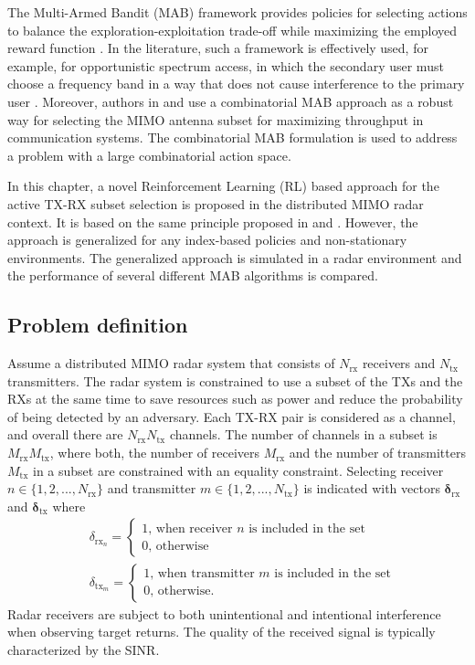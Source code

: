 \documentclass[english, 12pt, a4paper, elec, utf8, a-1b, online]{aaltothesis}
\newcommand{\easvtx}{\delta_{\text{tx}_m}}
\newcommand{\vasvtx}{\boldsymbol{\delta}_{\text{tx}}}
\newcommand{\easvrx}{\delta_{\text{rx}_n}}
\newcommand{\vasvrx}{\boldsymbol{\delta}_{\text{rx}}}
\begin{document}
The Multi-Armed Bandit (MAB) framework provides policies for selecting actions to balance the exploration-exploitation trade-off while maximizing the employed reward function \cite{Lattimore2019}.
In the literature, such a framework is effectively used, for example, for opportunistic spectrum access, in which the secondary user must choose a frequency band in a way that does not cause interference to the primary user \cite{Zhao2008}.
Moreover, authors in \cite{Mukherjee2012} and \cite{Kuai2019} use a combinatorial MAB approach as a robust way for selecting the MIMO antenna subset for maximizing throughput in communication systems.
The combinatorial MAB formulation is used to address a problem with a large combinatorial action space.

In this chapter, a novel Reinforcement Learning (RL) based approach for the active TX-RX subset selection is proposed in the distributed MIMO radar context. 
It is based on the same principle proposed in \cite{Mukherjee2012} and \cite{Kuai2019}. 
However, the approach is generalized for any index-based policies and non-stationary environments. 
The generalized approach is simulated in a radar environment and the performance of several different MAB algorithms is compared.

\subsection{Problem definition}

\newcommand{\ntx}{{N_{\text{tx}}}}
\newcommand{\nrx}{{N_{\text{rx}}}}
\newcommand{\srx}{{M_{\text{rx}}}}
\newcommand{\stx}{{M_{\text{tx}}}}


Assume a distributed MIMO radar system that consists of $\nrx$ receivers and $\ntx$ transmitters.
The radar system is constrained to use a subset of the TXs and the RXs at the same time to save resources such as power and reduce the probability of being detected by an adversary.
Each TX-RX pair is considered as a channel, and overall there are $\nrx\ntx$ channels.
The number of channels in a subset is $\srx \stx$, where both, the number of receivers $\srx$ and the number of transmitters $\stx$ in a subset are constrained with an equality constraint.
Selecting receiver $n \in \{1, 2, ..., \nrx\}$ and transmitter $m \in \{1,2, ..., \ntx\}$ is indicated with vectors $\vasvrx$ and $\vasvtx$ where
\begin{align}
    &\easvrx = 
    \left\{\begin{array}{l}
        1 \text{, when receiver $n$ is included in the set} \\
        0 \text{, otherwise}
    \end{array}\right.\\
    &\easvtx = 
    \left\{\begin{array}{l}
        1 \text{, when transmitter $m$ is included in the set} \\
        0 \text{, otherwise.}
    \end{array}\right.
\end{align}
Radar receivers are subject to both unintentional and intentional interference when observing target returns.
The quality of the received signal is typically characterized by the SINR.
\end{document}
